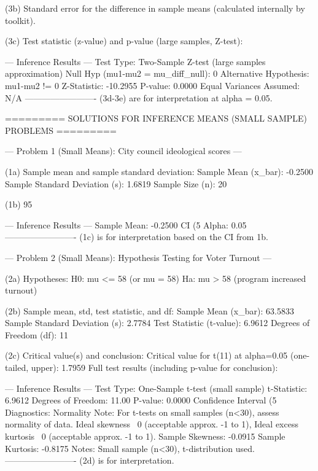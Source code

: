(3b) Standard error for the difference in sample means (calculated internally by toolkit).

(3c) Test statistic (z-value) and p-value (large samples, Z-test):

--- Inference Results ---
  Test Type: Two-Sample Z-test (large samples approximation)
  Null Hyp (mu1-mu2 = mu_diff_null): 0
  Alternative Hypothesis: mu1-mu2 != 0
  Z-Statistic: -10.2955
  P-value: 0.0000
  Equal Variances Assumed: N/A
-------------------------
(3d-3e) are for interpretation at alpha = 0.05.


========= SOLUTIONS FOR INFERENCE MEANS (SMALL SAMPLE) PROBLEMS =========


--- Problem 1 (Small Means): City council ideological scores ---

(1a) Sample mean and sample standard deviation:
  Sample Mean (x_bar): -0.2500
  Sample Standard Deviation (s): 1.6819
  Sample Size (n): 20

(1b) 95%

--- Inference Results ---
  Sample Mean: -0.2500
  CI (5%
  Alpha: 0.05
-------------------------
(1c) is for interpretation based on the CI from 1b.


--- Problem 2 (Small Means): Hypothesis Testing for Voter Turnout ---

(2a) Hypotheses: H0: mu <= 58 (or mu = 58)
                 Ha: mu > 58 (program increased turnout)

(2b) Sample mean, std, test statistic, and df:
  Sample Mean (x_bar): 63.5833
  Sample Standard Deviation (s): 2.7784
  Test Statistic (t-value): 6.9612
  Degrees of Freedom (df): 11

(2c) Critical value(s) and conclusion:
  Critical value for t(11) at alpha=0.05 (one-tailed, upper): 1.7959
  Full test results (including p-value for conclusion):

--- Inference Results ---
  Test Type: One-Sample t-test (small sample)
  t-Statistic: 6.9612
  Degrees of Freedom: 11.00
  P-value: 0.0000
  Confidence Interval (5%
  Diagnostics:
    Normality Note: For t-tests on small samples (n<30), assess normality of data. Ideal skewness ~0 (acceptable approx. -1 to 1), Ideal excess kurtosis ~0 (acceptable approx. -1 to 1).
    Sample Skewness: -0.0915
    Sample Kurtosis: -0.8175
  Notes: Small sample (n<30), t-distribution used.
-------------------------
(2d) is for interpretation.


